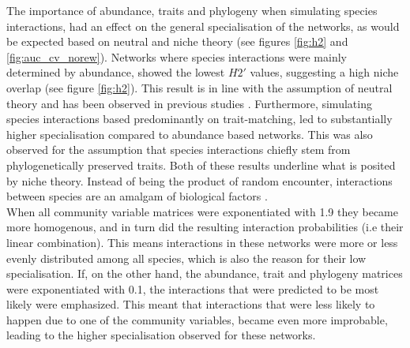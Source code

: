 \documentclass[12pt,a4paper]{article}
\begin{document}
The importance of abundance, traits and phylogeny when simulating species interactions, had an effect on the general specialisation of the networks, as would be expected based on neutral and niche theory (see figures \ref{fig:h2} and \ref{fig:auc_cv_norew}). Networks where species interactions were mainly determined by abundance, showed the lowest $H2'$ values, suggesting a high niche overlap (see figure \ref{fig:h2}). This result is in line with the assumption of neutral theory and has been observed in previous studies \parencite{Vazquez2005, Vazquez2007}. Furthermore, simulating species interactions based predominantly on trait-matching, led to substantially higher specialisation compared to abundance based networks. This was also observed for the assumption that species interactions chiefly stem from phylogenetically preserved traits. Both of these results underline what is posited by niche theory. Instead of being the product of random encounter, interactions between species are an amalgam of biological factors \parencite{Jordano2003, Rezende2007, Vazquez2009, Olesen2011}.\\
 When all community variable matrices were exponentiated with 1.9 they became more homogenous, and in turn did the resulting interaction probabilities (i.e their linear combination). This means interactions in these networks were more or less evenly distributed among all species, which is also the reason for their low specialisation. If, on the other hand, the abundance, trait and phylogeny matrices were exponentiated with 0.1, the interactions that were predicted to be most likely were emphasized. This meant that interactions that were less likely to happen due to one of the community variables, became even more improbable, leading to the higher specialisation observed for these networks. \paragraph{}
\end{document}
